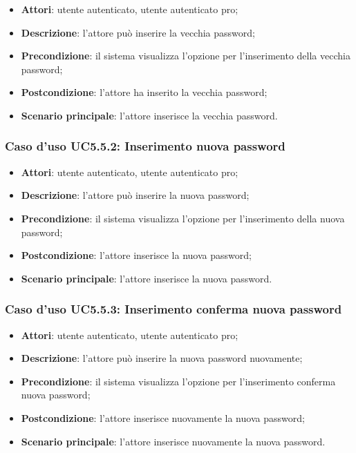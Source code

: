 \begin{itemize}
	\item \textbf{Attori}: utente autenticato, utente autenticato pro;
	\item \textbf{Descrizione}: l'attore può inserire la vecchia password;
	\item \textbf{Precondizione}: il sistema visualizza l'opzione per l'inserimento della vecchia password;
	\item \textbf{Postcondizione}: l'attore ha inserito la vecchia password;
	\item \textbf{Scenario principale}: l'attore inserisce la vecchia password.
\end{itemize}

\subsubsection{Caso d'uso UC5.5.2: Inserimento nuova password}

\begin{itemize}
	\item \textbf{Attori}: utente autenticato, utente autenticato pro;
	\item \textbf{Descrizione}: l'attore può inserire la nuova password;
	\item \textbf{Precondizione}: il sistema visualizza l'opzione per l'inserimento della nuova password;
	\item \textbf{Postcondizione}: l'attore inserisce la nuova password;
	\item \textbf{Scenario principale}: l'attore inserisce la nuova password.
\end{itemize}

\subsubsection{Caso d'uso UC5.5.3: Inserimento conferma nuova password}

\begin{itemize}
	\item \textbf{Attori}: utente autenticato, utente autenticato pro;
	\item \textbf{Descrizione}: l'attore può inserire la nuova password nuovamente;
	\item \textbf{Precondizione}: il sistema visualizza l'opzione per l'inserimento conferma nuova password;
	\item \textbf{Postcondizione}: l'attore inserisce nuovamente la nuova password;
	\item \textbf{Scenario principale}: l'attore inserisce nuovamente la nuova password.
\end{itemize}

